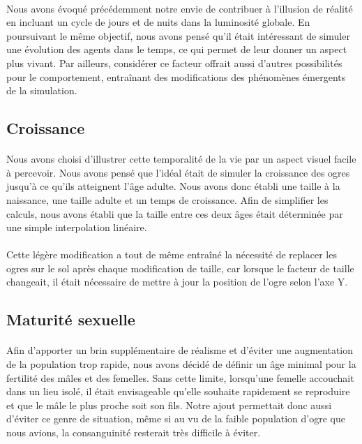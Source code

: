 \paragraph{}
Nous avons évoqué précédemment notre envie de contribuer à l'illusion de
réalité en incluant un cycle de jours et de nuits dans la luminosité globale.
En poursuivant le même objectif, nous avons pensé qu'il était intéressant de
simuler une évolution des agents dans le temps, ce qui permet de leur
donner un aspect plus vivant. Par ailleurs, considérer ce facteur offrait
aussi d'autres possibilités pour le comportement, entraînant des modifications
des phénomènes émergents de la simulation.

\subsection{Croissance}
\paragraph{}
Nous avons choisi d'illustrer cette temporalité de la vie par un aspect visuel
facile à percevoir. Nous avons pensé que l'idéal était de simuler la
croissance des ogres jusqu'à ce qu'ils atteignent l'âge adulte. Nous avons
donc établi une taille à la naissance, une taille adulte et un temps de
croissance. Afin de simplifier les calculs, nous avons établi que la taille
entre ces deux âges était déterminée par une simple interpolation linéaire.

\paragraph{}
Cette légère modification a tout de même entraîné la nécessité de replacer les
ogres sur le sol après chaque modification de taille, car lorsque le facteur
de taille changeait, il était nécessaire de mettre à jour la position de
l'ogre selon l'axe Y.

\subsection{Maturité sexuelle}
\paragraph{}
Afin d'apporter un brin supplémentaire de réalisme et d'éviter une
augmentation de la population trop rapide, nous avons décidé de définir un âge
minimal pour la fertilité des mâles et des femelles. Sans cette limite,
lorsqu'une femelle accouchait dans un lieu isolé, il était envisageable
qu'elle souhaite rapidement se reproduire et que le mâle le plus proche soit
son fils. Notre ajout permettait donc aussi d'éviter ce genre de situation,
même si au vu de la faible population d'ogre que nous avions, la consanguinité
resterait très difficile à éviter.

